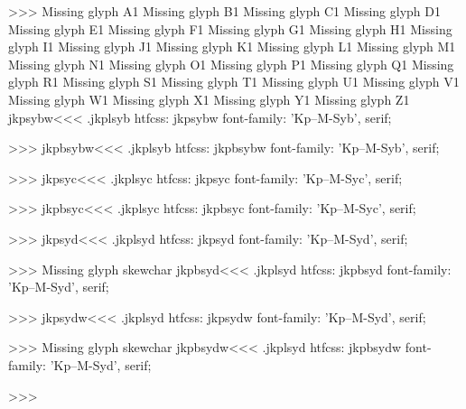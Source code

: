 >>>
Missing glyph	A1
Missing glyph	B1
Missing glyph	C1
Missing glyph	D1
Missing glyph	E1
Missing glyph	F1
Missing glyph	G1
Missing glyph	H1
Missing glyph	I1
Missing glyph	J1
Missing glyph	K1
Missing glyph	L1
Missing glyph	M1
Missing glyph	N1
Missing glyph	O1
Missing glyph	P1
Missing glyph	Q1
Missing glyph	R1
Missing glyph	S1
Missing glyph	T1
Missing glyph	U1
Missing glyph	V1
Missing glyph	W1
Missing glyph	X1
Missing glyph	Y1
Missing glyph	Z1
\<jkpsybw\><<<
.jkplsyb
htfcss:  jkpsybw  font-family: 'Kp--M-Syb', serif;

>>>
\<jkpbsybw\><<<
.jkplsyb
htfcss:  jkpbsybw  font-family: 'Kp--M-Syb', serif;

>>>
\<jkpsyc\><<<
.jkplsyc
htfcss:  jkpsyc  font-family: 'Kp--M-Syc', serif;

>>>
\<jkpbsyc\><<<
.jkplsyc
htfcss:  jkpbsyc  font-family: 'Kp--M-Syc', serif;

>>>
\<jkpsyd\><<<
.jkplsyd
htfcss:  jkpsyd  font-family: 'Kp--M-Syd', serif;

>>>
Missing glyph	skewchar
\<jkpbsyd\><<<
.jkplsyd
htfcss:  jkpbsyd  font-family: 'Kp--M-Syd', serif;

>>>
\<jkpsydw\><<<
.jkplsyd
htfcss:  jkpsydw  font-family: 'Kp--M-Syd', serif;

>>>
Missing glyph	skewchar
\<jkpbsydw\><<<
.jkplsyd
htfcss:  jkpbsydw  font-family: 'Kp--M-Syd', serif;

>>>
\bye
